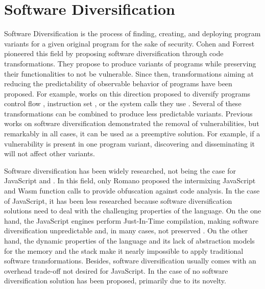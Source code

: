 \section{Software Diversification}

Software Diversification is the process of finding, creating, and deploying program variants for a given original program \cite{okhravi2013survey} for the sake of security.
Cohen \etal \cite{cohen1993operating} and Forrest \etal \cite{595185} pioneered this field by proposing software diversification through code transformations. 
They propose to produce variants of programs while preserving their functionalities to not be vulnerable.
Since then, transformations aiming at reducing the predictability of observable behavior of programs have been proposed. For example, works on this direction proposed to diversify programs control flow \cite{davi2015isomeron}, instruction set \cite{barrantes2003randomized}, or the system calls they use \cite{Chew02mitigatingbuffer}. 
Several of these transformations can be combined to produce less predictable variants.
Previous works on software diversification demonstrated the removal of vulnerabilities, but remarkably in all cases, it can be used as a preemptive solution.
For example, if a vulnerability is present in one program variant, discovering and disseminating it will not affect other variants.



Software diversification has been widely researched, not being the case for JavaScript and \wasm.
In this field, only Romano \etal \cite{wobfuscator} proposed the intermixing JavaScript and Wasm function calls to provide obfuscation against code analysis. 
In the case of JavaScript, it has been less researched because software diversification solutions need to deal with the challenging properties of the language.
On the one hand, the JavaScript engines perform Just-In-Time compilation, making software diversification unpredictable and, in many cases, not preserved \cite{STRAC}.
On the other hand, the dynamic properties of the language and its lack of abstraction models for the memory and the stack make it nearly impossible to apply traditional software transformations.
Besides, software diversification usually comes with an overhead trade-off not desired for JavaScript. 
In the case of \wasm no software diversification solution has been proposed, primarily due to its novelty.






